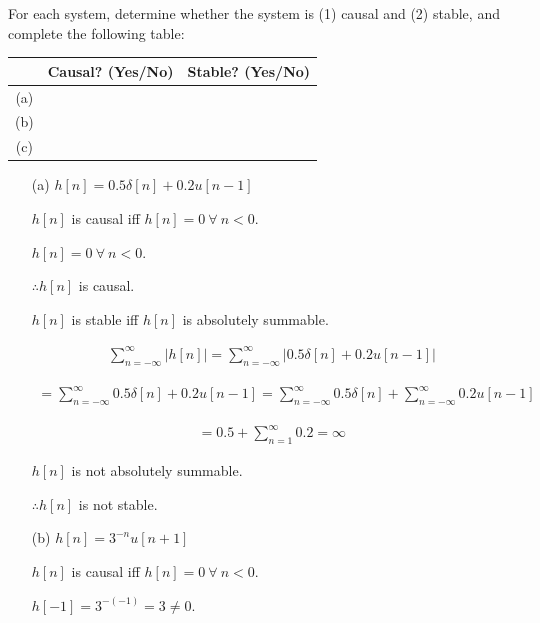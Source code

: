 \documentclass[fleqn]{article}
\begin{document}
\begin{enumerate}[nolistsep]
\begin{enumerate}[nolistsep]
			\end{enumerate}
			
			For each system, determine whether the system is (1) causal and (2) stable, and complete the following table:
			
			\begin{center}
				\begin{tabular}{|c|c|c|}
					\hline
					& Causal? (Yes/No) & Stable? (Yes/No) \\
					\hline
					(a) & & \\
					\hline
					(b) & & \\
					\hline
					(c) & & \\
					\hline
				\end{tabular}
			\end{center}
			
			\begin{enumerate}[nolistsep]
				\item[(a)] $h[n] = 0.5\delta[n] + 0.2u[n-1]$
				
					$h[n]$ is causal iff $h[n] = 0\ \forall\ n < 0$.
					
					$h[n] = 0\ \forall\ n < 0$.
					
					$\therefore h[n]$ is causal.
					
					$h[n]$ is stable iff $h[n]$ is absolutely summable.
					
					\begin{align*}
						\sum_{n=-\infty}^{\infty}{|h[n]|} = \sum_{n=-\infty}^{\infty}{|0.5\delta[n] + 0.2u[n-1]|}
					\end{align*}
					
					\begin{align*}
						= \sum_{n=-\infty}^{\infty}{0.5\delta[n] + 0.2u[n-1]} = \sum_{n=-\infty}^{\infty}{0.5\delta[n]} + \sum_{n=-\infty}^{\infty}{0.2u[n-1]}
					\end{align*}
				
					\begin{align*}
						= 0.5 + \sum_{n=1}^{\infty}{0.2} = \infty
					\end{align*}
				
					$h[n]$ is not absolutely summable.
				
					$\therefore h[n]$ is not stable.
				
				\item[(b)] $h[n] = 3^{-n}u[n+1]$
				
					$h[n]$ is causal iff $h[n] = 0\ \forall\ n < 0$.
					
					$h[-1] = 3^{-(-1)} = 3 \neq 0$.
					

\end{enumerate}
\end{enumerate}
\end{document}
